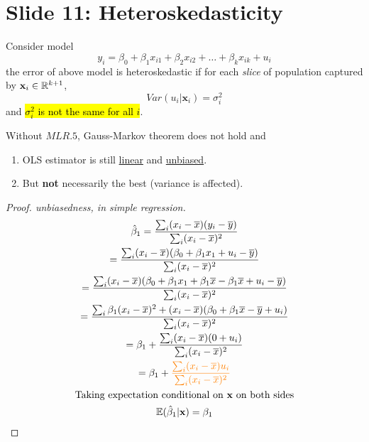 \documentclass[]{article}
\begin{document}
	\section{Slide 11: Heteroskedasticity}
		\begin{definition}
			Consider model 
			\begin{equation}
				y_i = \beta_0 + \beta_1 x_{i1} + \beta_2 x_{i2} + \dots + \beta_k x_{ik} + u_i
			\end{equation}
			the error of above model is heteroskedastic if for each \emph{slice} of population captured by $\textbf{x}_i \in \mathbb{R}^{k+1}$, 
			\begin{equation}
				Var(u_i | \textbf{x}_i) = \sigma_i^2
			\end{equation}
			and \hl{$\sigma_i^2$ is not the same for all $i$}.
		\end{definition}
		\begin{remark}[Consequence]
			Without $MLR.5$, Gauss-Markov theorem does not hold and 
			\begin{enumerate}
				\item OLS estimator is still \ul{linear} and \ul{unbiased}.
				\item But \textbf{not} necessarily the best (variance is affected).
			\end{enumerate}
		\end{remark}
		\begin{proof}[Proof. unbiasedness, in simple regression]
			\begin{gather}
				\hat{\beta}_1 = \frac{\sum_i(x_i - \overline{x})(y_i - \overline{y})}{\sum_i(x_i - \overline{x})^2} \\
				= \frac{\sum_i(x_i - \overline{x})(\beta_0 + \beta_1 x_1 + u_i - \overline{y})}{\sum_i(x_i - \overline{x})^2} \\
				= \frac{\sum_i(x_i - \overline{x})(\beta_0 + \beta_1 x_1 + \beta_1 \overline{x} - \beta_1 \overline{x} + u_i - \overline{y})}{\sum_i(x_i - \overline{x})^2} \\
				= \frac{\sum_i \beta_1 (x_i - \overline{x})^2 + (x_i - \overline{x}) (\beta_0 + \beta_1 \overline{x} - \overline{y} + u_i)}{\sum_i(x_i - \overline{x})^2} \\
				= \beta_1 + \frac{\sum_i (x_i - \overline{x}) (0 + u_i)}{\sum_i (x_i - \overline{x})^2} \\
				= \beta_1 + \textcolor{orange}{\frac{\sum_i (x_i - \overline{x})u_i}{\sum_i (x_i - \overline{x})^2}} \\
				\text{{Taking expectation conditional on \textbf{x} on both sides}} \\
				\mathbb{E}({\hat{\beta}_1|\textbf{x}}) = \beta_1 
			\end{gather}
		\end{proof}
		
\end{document}
